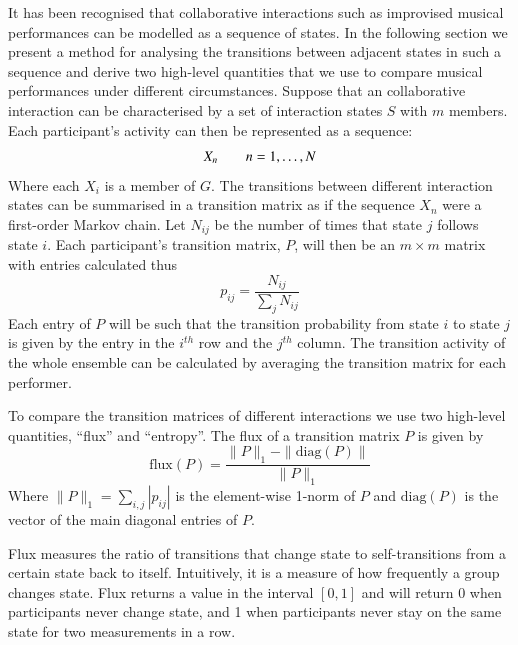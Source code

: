 \documentclass{sigchi}
\begin{document}
It has been recognised that collaborative interactions such as
improvised musical performances can be modelled as a sequence of
states. In the following section we present a method for analysing the
transitions between adjacent states in such a sequence and derive two
high-level quantities that we use to compare musical performances
under different circumstances. Suppose that an collaborative
interaction can be characterised by a set of interaction states $S$
with $m$ members.
Each participant's activity can then be represented as a sequence:
\begin{equation}
 X_n \hskip 2em n = 1, \ldots, N
\end{equation}
Where each $X_i$ is a member of $G$. The transitions between different
interaction states can be summarised in a transition matrix as if the
sequence $X_n$ were a first-order Markov chain. Let $N_{ij}$ be the
number of times that state $j$ follows state $i$. Each participant's
transition matrix, $P$, will then be an $m \times m$ matrix with
entries calculated thus
\begin{equation}
  p_{ij} = \frac{N_{ij}}{\sum_j N_{ij}}
\end{equation}
Each entry of $P$ will be such that the transition probability from
state $i$ to state $j$ is given by the entry in the $i^{th}$ row and
the $j^{th}$ column. The transition activity of the whole ensemble can
be calculated by averaging the transition matrix for each performer.

To compare the transition matrices of different interactions we use
two high-level quantities, ``flux'' and ``entropy''. The flux of a
transition matrix $P$ is given by
\begin{equation}
  \mathrm{flux}(P) = \frac{\|P\|_1-\|\mathrm{diag}(P)\|}{\|P\|_1}
\end{equation}
Where $\|P\|_1 = \sum_{i,j}|p_{ij}|$ is the element-wise 1-norm of $P$
and $\mathrm{diag}(P)$ is the vector of the main diagonal entries of
$P$.

Flux measures the ratio of transitions that change
state to self-transitions from a certain state back to itself.
Intuitively, it is a measure of how frequently a group changes state. Flux
returns a value in the interval $[0,1]$ and will return 0 when
participants never change state, and 1 when participants never stay on
the same state for two measurements in a row.
\end{document}
